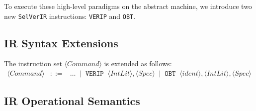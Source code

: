 \documentclass{article}
\begin{document}
To execute these high-level paradigms on the abstract machine, we introduce two new \texttt{SelVerIR} instructions: \texttt{VERIP} and \texttt{OBT}. 

\subsection{IR Syntax Extensions}
The instruction set $\langle \mathit{Command} \rangle$ is extended as follows:
\[
\begin{array}{rcl}
\langle \mathit{Command} \rangle
&::=& 
\dots
\;\mid\; \mathbf{\mathtt{VERIP} \;\; \langle \mathit{IntLit} \rangle\mathtt{,} \langle \mathit{Spec} \rangle}
\;\mid\; \mathbf{\mathtt{OBT} \;\; \langle \mathit{ident} \rangle\mathtt{,} \langle \mathit{IntLit} \rangle\mathtt{,} \langle \mathit{Spec} \rangle}
\end{array}
\]

\subsection{IR Operational Semantics}

\begin{table}[htb!]
\setlength{\tabcolsep}{0pt} 
\centering
\renewcommand{\arraystretch}{2.2} 
\large
{}
\caption{Operational semantics of LogiVerIR instructions}
\label{tab:logiverir-sos}
\end{table}
\end{document}
